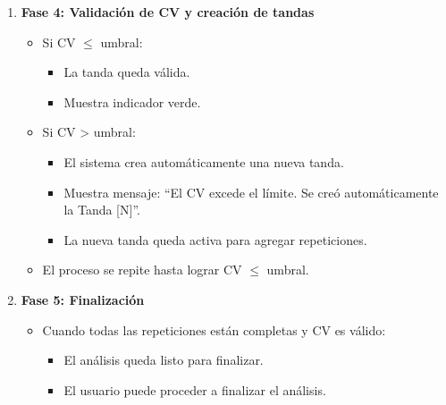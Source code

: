 \begin{enumerate}[nosep]
\begin{itemize}[nosep]
\begin{itemize}[nosep]
        \end{itemize}
    \end{itemize}
    \item \textbf{Fase 4: Validación de CV y creación de tandas}
    \begin{itemize}[nosep]
        \item Si CV $\leq$ umbral:
        \begin{itemize}[nosep]
            \item La tanda queda válida.
            \item Muestra indicador verde.
        \end{itemize}
        \item Si CV > umbral:
        \begin{itemize}[nosep]
            \item El sistema crea automáticamente una nueva tanda.
            \item Muestra mensaje: ``El CV excede el límite. Se creó automáticamente la Tanda [N]''.
            \item La nueva tanda queda activa para agregar repeticiones.
        \end{itemize}
        \item El proceso se repite hasta lograr CV $\leq$ umbral.
    \end{itemize}
    \item \textbf{Fase 5: Finalización}
    \begin{itemize}[nosep]
        \item Cuando todas las repeticiones están completas y CV es válido:
        \begin{itemize}[nosep]
            \item El análisis queda listo para finalizar.
            \item El usuario puede proceder a finalizar el análisis.
        \end{itemize}
    \end{itemize}
\end{enumerate}

